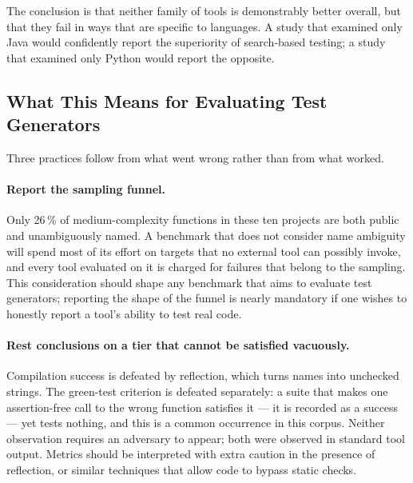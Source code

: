 The conclusion is that neither family of tools is demonstrably better overall, but that they
fail in ways that are specific to languages. A study that examined only Java would confidently
report the superiority of search-based testing; a study that examined only Python would report
the opposite.

\subsection{What This Means for Evaluating Test Generators}

Three practices follow from what went wrong rather than from what worked.

\paragraph{Report the sampling funnel.}
Only 26\,\% of medium-complexity functions in these ten projects are both public and
unambiguously named. A benchmark that does not consider name ambiguity will spend most of its
effort on targets that no external tool can possibly invoke, and every tool evaluated on it is
charged for failures that belong to the sampling. This consideration should shape any benchmark
that aims to evaluate test generators; reporting the shape of the funnel is nearly mandatory if
one wishes to honestly report a tool's ability to test real code.

\paragraph{Rest conclusions on a tier that cannot be satisfied vacuously.}
Compilation success is defeated by reflection, which turns names into unchecked strings. The
green-test criterion is defeated separately: a suite that makes one assertion-free call to the
wrong function satisfies it --- it is recorded as a success --- yet tests nothing, and this is
a common occurrence in this corpus. Neither observation requires an adversary to appear; both
were observed in standard tool output. Metrics should be interpreted with extra caution in the
presence of reflection, or similar techniques that allow code to bypass static checks.

